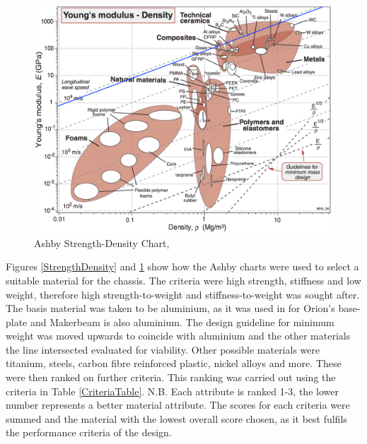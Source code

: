 \begin{figure}[h!]
\centering
\includegraphics[width=15cm]{Images/MaxImages/YmodDensity.png}
\caption{Ashby Strength-Density Chart, \cite{Ashby05}}
\label{YmodDensity}
\end{figure}

Figures \ref{StrengthDensity} and \ref{YmodDensity} show how the Ashby charts were used to select a suitable material for the chassis. The criteria were high strength, stiffness and low weight, therefore high strength-to-weight and stiffness-to-weight was sought after. The basis material was taken to be aluminium, as it was used in for Orion’s base-plate and Makerbeam is also aluminium. The design guideline for minimum weight was moved upwards to coincide with aluminium and the other materials the line intersected evaluated for viability. Other possible materials were titanium, steels, carbon fibre reinforced plastic, nickel alloys and more. These were then ranked on further criteria. This ranking was carried out using the criteria in Table \ref{CriteriaTable}. N.B. Each attribute is ranked 1-3, the lower number represents a better material attribute. The scores for each criteria were summed and the material with the lowest overall score chosen, as it best fulfils the performance criteria of the design.

